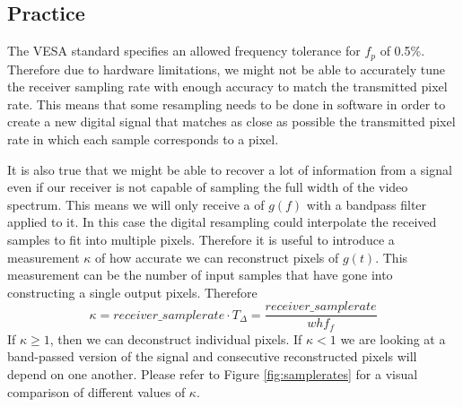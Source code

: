 \documentclass[a4paper,12pt,twoside,openright]{report}
\begin{document}
\subsection{Practice}
The VESA standard specifies an allowed frequency tolerance for $f_{p}$ of 0.5\%. Therefore due to hardware limitations, we might not be able to accurately tune the receiver sampling rate with enough accuracy to match the transmitted pixel rate. This means that some resampling needs to be done in software in order to create a new digital signal that matches as close as possible the transmitted pixel rate in which each sample corresponds to a pixel.

It is also true that we might be able to recover a lot of information from a signal even if our receiver is not capable of sampling the full width of the video spectrum. This means we will only receive a of $g(f)$ with a bandpass filter applied to it. In this case the digital resampling could interpolate the received samples to fit into multiple pixels. Therefore it is useful to introduce a measurement $\kappa$ of how accurate we can reconstruct pixels of $g(t)$. This measurement can be the number of input samples that have gone into constructing a single output pixels. Therefore
\begin{equation}
\kappa = receiver\_samplerate \cdot T_{\Delta} = \frac{receiver\_samplerate}{w h f_{f}}
\end{equation}
If $\kappa \geq 1$, then we can deconstruct individual pixels. If $\kappa < 1$ we are looking at a band-passed version of the signal and consecutive reconstructed pixels will depend on one another. Please refer to Figure \ref{fig:samplerates} for a visual comparison of different values of $\kappa$.
\end{document}

